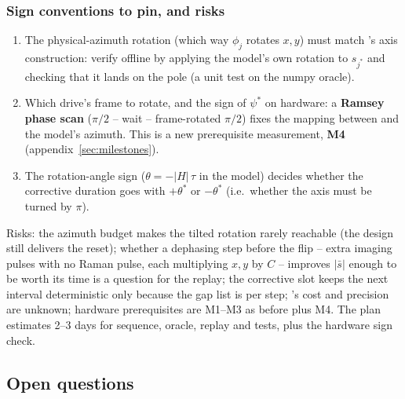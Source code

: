 \subsubsection{Sign conventions to pin, and risks}

\begin{enumerate}[nosep]
  \item The physical-azimuth rotation (which way $\phi_j$ rotates $x, y$) must
    match 's axis construction: verify offline by
    applying the model's own rotation to $s_{j^*}$ and checking that it lands
    on the pole (a unit test on the numpy oracle).
  \item Which drive's frame to rotate, and the sign of $\psi^*$ on hardware: a
    \textbf{Ramsey phase scan} ($\pi/2$ -- wait -- frame-rotated $\pi/2$) fixes
    the mapping between  and the model's azimuth.
    This is a new prerequisite measurement, \textbf{M4}
    (appendix~\ref{sec:milestones}).
  \item The rotation-angle sign ($\theta = -|H|\,\tau$ in the model) decides
    whether the corrective duration goes with $+\theta^*$ or $-\theta^*$ (i.e.\
    whether the axis must be turned by $\pi$).
\end{enumerate}

Risks: the azimuth budget makes the tilted rotation rarely reachable (the
design still delivers the reset); whether a dephasing step before the flip --
extra imaging pulses with no Raman pulse, each multiplying $x, y$ by $C$ --
improves $|\bar s|$ enough to be worth its time is a question for the replay;
the corrective slot keeps the next interval deterministic only because the
gap list is per step; \code{Math.atan2\_2pi}'s cost and precision are unknown;
hardware prerequisites are M1--M3 as before plus M4. The plan estimates 2--3
days for sequence, oracle, replay and tests, plus the hardware sign check.

\subsection{Open questions}

